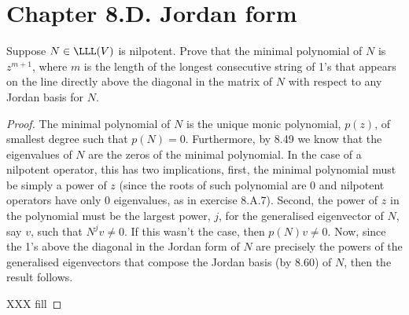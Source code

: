\section*{Chapter 8.D. Jordan form}


\begin{exercise}{3}
  Suppose $N\in\LLL(V)$ is nilpotent. Prove that the minimal polynomial of $N$ is $z^{m+1}$, where $m$ is the length of the longest consecutive string of 1's that appears on the line directly above the diagonal in the matrix of $N$ with respect to any Jordan basis for $N$.
\end{exercise}
\begin{proof}
 The minimal polynomial of $N$ is the unique monic polynomial, $p(z)$, of smallest degree such that $p(N)=0$. Furthermore, by 8.49 we know that the eigenvalues of $N$ are the zeros of the minimal polynomial. In the case of a nilpotent operator, this has two implications, first, the minimal polynomial must be simply a power of $z$ (since the roots of such polynomial are 0 and nilpotent operators have only 0 eigenvalues, as in exercise 8.A.7). Second, the power of $z$ in the polynomial must be the largest power, $j$, for the generalised eigenvector of $N$, say $v$, such that $N^jv\neq 0$. If this wasn't the case, then $p(N)v\neq 0$. Now, since the 1's above the diagonal in the Jordan form of $N$ are precisely the powers of the generalised eigenvectors that compose the Jordan basis (by 8.60) of $N$, then the result follows. 

 XXX fill
\end{proof}

